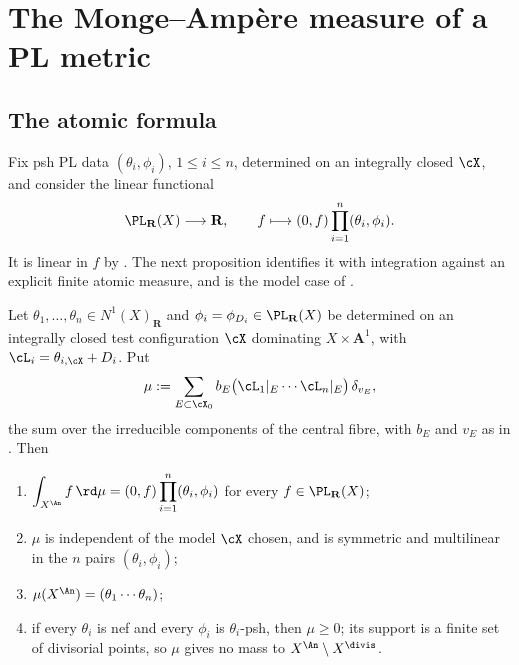 \section{The Monge--Amp\`ere measure of a PL metric}
\label{sec:ch46-pl-measure}

\subsection{The atomic formula}
\label{sec:ch46-atomic}

Fix psh PL data $(\theta_i,\phi_i)$, $1\le i\le n$, determined on an
integrally closed $\cX$, and consider the linear functional
\[
 \PL_{\mathbf R}(X)\longrightarrow\mathbf R,
 \qquad
 f\longmapsto(0,f)\prod_{i=1}^n(\theta_i,\phi_i).
\]
It is linear in $f$ by .  The next
proposition identifies it with integration against an explicit finite
atomic measure, and is the model case of .

\begin{proposition}
\label{prop:ch46-pl-measure}
Let $\theta_1,\dots,\theta_n\in N^1(X)_{\mathbf R}$ and
$\phi_i=\phi_{D_i}\in\PL_{\mathbf R}(X)$ be determined on an integrally
closed test configuration $\cX$ dominating $X\times\mathbf A^1$, with
$\cL_i=\theta_{i,\cX}+D_i$.  Put
\[
 \mu:=\sum_{E\subset\cX_0}
      b_E\bigl(\cL_1|_E\cdots\cL_n|_E\bigr)\,\delta_{v_E},
\]
the sum over the irreducible components of the central fibre, with
$b_E$ and $v_E$ as in .  Then
\begin{enumerate}
\item\label{itm:ch46-pl-ma:duality}
      $\displaystyle\int_{X^{\An}}f\,\rd\mu=(0,f)\prod_{i=1}^n(\theta_i,\phi_i)$
      for every $f\in\PL_{\mathbf R}(X)$;
\item\label{itm:ch46-pl-ma:indep}
      $\mu$ is independent of the model $\cX$ chosen, and is symmetric
      and multilinear in the $n$ pairs $(\theta_i,\phi_i)$;
\item\label{itm:ch46-pl-ma:mass}
      $\mu(X^{\An})=(\theta_1\cdots\theta_n)$;
\item\label{itm:ch46-pl-ma:pos}
      if every $\theta_i$ is nef and every $\phi_i$ is
      $\theta_i$-psh, then $\mu\ge0$; its support is a finite set of
      divisorial points, so $\mu$ gives no mass to $X^{\An}\setminus
      X^{\divis}$.
\end{enumerate}
\end{proposition}

